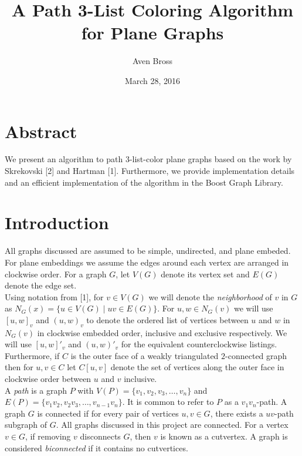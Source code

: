 \documentclass[12pt,a4paper]{article}
\begin{document}
\title{A Path 3-List Coloring Algorithm for Plane Graphs}
\date{March 28, 2016}
\author{Aven Bross}

\maketitle

\section*{Abstract}

We present an algorithm to path $3$-list-color plane graphs based on the work by Skrekovski [2]
and Hartman [1]. Furthermore, we provide implementation details and an efficient implementation of the
algorithm in the Boost Graph Library.

\section{Introduction}

\noindent All graphs discussed are assumed to be simple, undirected, and plane embeded. For plane embeddings we assume
the edges around each vertex are arranged in clockwise order. For a graph $G$, let $V(G)$ denote its vertex set
and $E(G)$ denote the edge set.\\

\noindent Using notation from [1], for $v\in V(G)$ we will denote the \emph{neighborhood} of $v$ in $G$ as
$N_G(x)=\{u\in V(G)\mid uv\in E(G)\}$. For $u,w\in N_G(v)$ we will use $[u,w]_v$ and $(u,w)_v$ to denote the ordered list of vertices between $u$
and $w$ in $N_G(v)$ in clockwise embedded order, inclusive and exclusive respectively. We will use $[u,w]'_v$ and $(u,w)'_v$ for the
equivalent counterclockwise listings. Furthermore, if $C$ is the outer face of a weakly triangulated $2$-connected
graph then for $u,v\in C$ let $C[u,v]$ denote the set of
vertices along the outer face in clockwise order between $u$ and $v$ inclusive. \\

\noindent A \emph{path} is a graph $P$ with $V(P)=\{v_1,v_2,v_3,\ldots,v_n\}$ and $E(P)=\{v_1v_2,v_2v_3,\ldots,v_{n-1}v_n\}$.
It is common to refer to $P$ as a $v_1v_n$-path. A graph $G$ is connected if for every pair of vertices
$u,v\in G$, there exists a $uv$-path subgraph of $G$. All graphs discussed in this project are connected. For a vertex
$v\in G$, if removing $v$ disconnects $G$, then $v$ is known as a cutvertex. A graph is considered
\emph{biconnected} if it contains no cutvertices.\\
\end{document}
